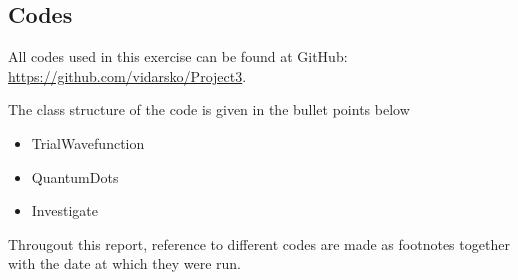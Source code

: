 \documentclass[a4paper,10pt,english]{article}
\numberwithin{figure}{subsection}
\numberwithin{table}{subsection}
\numberwithin{equation}{subsection}
\begin{document}
\begin{appendices}
\clearpage


\section{Codes} \label{sec:codes}
All codes used in this exercise can be found at GitHub: \newline
\url{https://github.com/vidarsko/Project3}. 

The class structure of the code is given in the bullet points below

\begin{itemize}
    \item TrialWavefunction
    \item QuantumDots
    \item Investigate
\end{itemize}

Througout this report, reference to different codes are made as footnotes together with the date at which they were run. 

\end{appendices}
\end{document}
